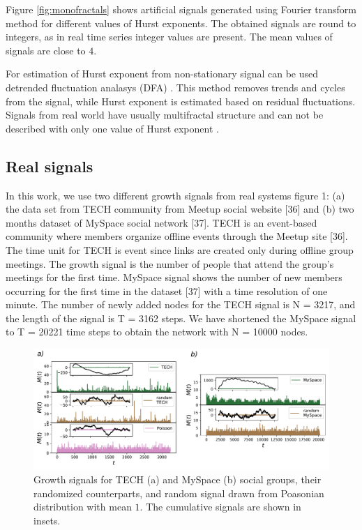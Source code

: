 Figure \ref{fig:monofractals} shows artificial signals generated using Fourier transform method for different values of Hurst exponents. The obtained signals are round to integers, as in real time series integer values are present. The mean values of signals are close to $4$.

For estimation of Hurst exponent from non-stationary signal can be used detrended fluctuation analasys (DFA) \cite{kantelhardt2001} \cite{peng1994}. This method removes trends and cycles from the signal, while Hurst exponent is estimated based on residual fluctuations. Signals from real world have usually  multifractal structure and can not be described with only one value of Hurst exponent \cite{kantelhardt2002}.



\subsection{Real signals}

In this work, we use two different growth signals from real systems figure 1: (a) the
data set from TECH community from Meetup social website [36] and (b) two months
dataset of MySpace social network [37]. TECH is an event-based community where
members organize offline events through the Meetup site [36]. The time unit for TECH
is event since links are created only during offline group meetings. The growth signal
is the number of people that attend the group’s meetings for the first time. MySpace
signal shows the number of new members occurring for the first time in the dataset [37]
with a time resolution of one minute. The number of newly added nodes for the TECH
signal is N = 3217, and the length of the signal is T = 3162 steps. We have shortened
the MySpace signal to T = 20221 time steps to obtain the network with N = 10000
nodes.
\begin{figure}[!ht]
	\centering
	\includegraphics[width=\linewidth]{Figures/signals.pdf}
	\caption{Growth signals for TECH (a) and MySpace (b) social groups, their randomized counterparts, and random signal drawn from Poasonian distribution with mean $1$. The cumulative signals are shown in insets.}
	\label{fig:signals}
\end{figure}

